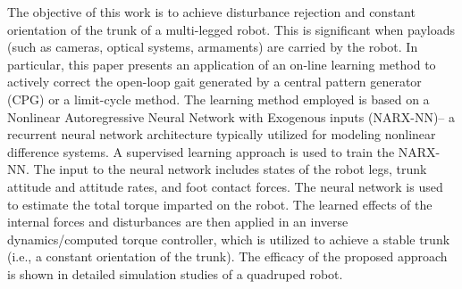 The objective of this work is to achieve disturbance rejection and constant orientation of the trunk of a multi-legged robot. This is significant when payloads (such as cameras, optical systems, armaments) are carried by the robot. In particular, this paper presents an application of an on-line learning method to actively correct the open-loop gait generated by a central pattern generator (CPG) or a limit-cycle method. The learning method employed is based on a Nonlinear Autoregressive Neural Network with Exogenous inputs (NARX-NN)-- a recurrent neural network architecture typically utilized for modeling nonlinear difference systems. A supervised learning approach is used to train the NARX-NN. The input to the neural network includes states of the robot legs, trunk attitude and attitude rates, and foot contact forces. The neural network is used to estimate the total torque imparted on the robot. The learned effects of the internal forces and disturbances are then applied in an inverse dynamics/computed torque controller, which is utilized to achieve a stable trunk (i.e., a constant orientation of the trunk). The efficacy of the proposed approach is shown in detailed simulation studies of a quadruped robot. 